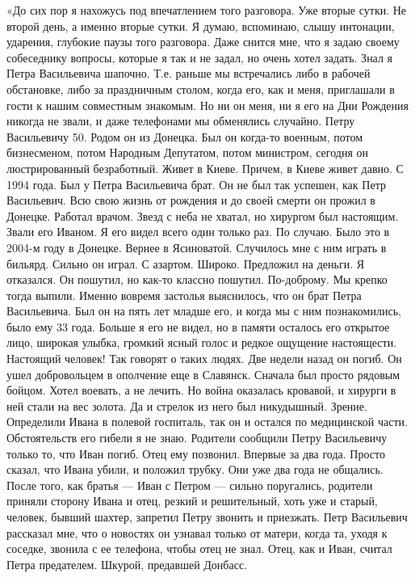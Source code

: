 «До сих пор я нахожусь под впечатлением того разговора. Уже вторые сутки. Не второй день, а именно вторые сутки. Я думаю, вспоминаю, слышу интонации, ударения, глубокие паузы того разговора. Даже снится мне, что я задаю своему собеседнику вопросы, которые я так и не задал, но очень хотел задать. 
Знал я Петра Васильевича шапочно. Т.е. раньше мы встречались либо в рабочей обстановке, либо за праздничным столом, когда его, как и меня, приглашали в гости к нашим совместным знакомым. Но ни он меня, ни я его на Дни Рождения никогда не звали, и даже телефонами мы обменялись случайно. 
Петру Васильевичу 50. Родом он из Донецка. Был он когда-то военным, потом бизнесменом, потом Народным Депутатом, потом министром, сегодня он люстрированный безработный. Живет в Киеве. Причем, в Киеве живет давно. С 1994 года. 
Был у Петра Васильевича брат. Он не был так успешен, как Петр Васильевич. Всю свою жизнь от рождения и до своей смерти он прожил в Донецке. Работал врачом. Звезд с неба не хватал, но хирургом был настоящим. Звали его Иваном. Я его видел всего один только раз. По случаю. 
Было это в 2004-м году в Донецке. Вернее в Ясиноватой. Случилось мне с ним играть в бильярд. Сильно он играл. С азартом. Широко. Предложил на деньги. Я отказался. Он пошутил, но как-то классно пошутил. По-доброму. Мы крепко тогда выпили. Именно вовремя застолья выяснилось, что он брат Петра Васильевича. Был он на пять  лет младше его, и когда мы с ним познакомились, было ему 33 года.
Больше я его не видел, но в памяти осталось его открытое лицо, широкая улыбка, громкий ясный голос и редкое ощущение настоящести. Настоящий человек! Так говорят о таких людях. 
Две недели назад он погиб. Он ушел добровольцем в ополчение еще в Славянск. Сначала был просто рядовым бойцом. Хотел воевать, а не лечить. Но война оказалась кровавой, и хирурги в ней стали на вес золота. Да и стрелок из него был никудышный. Зрение. Определили Ивана в полевой госпиталь, так он и остался по медицинской части. 
Обстоятельств его гибели я не знаю. Родители сообщили Петру Васильевичу только то, что Иван погиб. Отец ему позвонил. Впервые за два года. Просто сказал, что Ивана убили, и положил трубку. Они уже два года не общались. После того, как братья --- Иван с Петром --- сильно поругались, родители приняли сторону Ивана и отец, резкий и решительный, хоть уже и старый, человек, бывший шахтер, запретил Петру звонить и приезжать. Петр Васильевич рассказал мне, что о новостях он узнавал только от матери, когда та, уходя к соседке, звонила с ее телефона, чтобы отец не знал. Отец, как и Иван, считал Петра предателем. Шкурой, предавшей Донбасс. 
